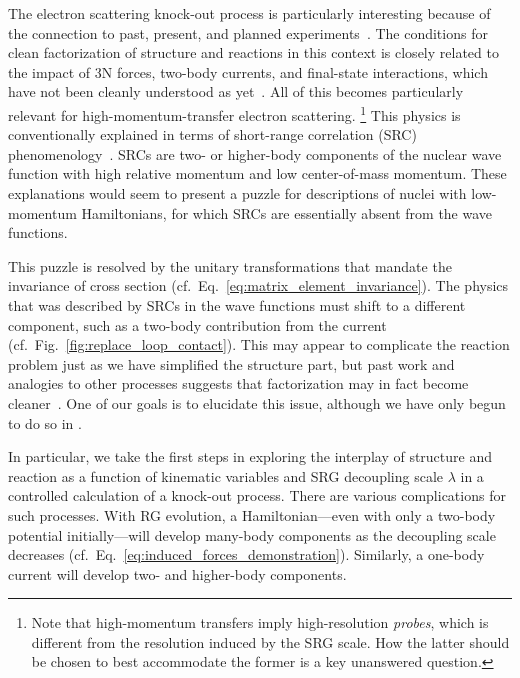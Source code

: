 	The electron scattering knock-out process is particularly interesting because
	of the connection to past, present, and planned
	experiments~\cite{Boffi:1996, LENP_white_paper2015}.
	The conditions for clean factorization
	of structure and reactions in this context is closely related to the impact of
	3N forces,
	two-body currents, and final-state interactions, which have not been cleanly
	understood as yet~\cite{Furnstahl:2010wd}.
	All of this becomes particularly relevant for high-momentum-transfer electron
	scattering.%
	\footnote{Note that high-momentum transfers imply high-resolution
	\emph{probes}, which is different from the resolution induced by the SRG
	scale.  How the latter should be chosen to best
	accommodate the former is a key unanswered question.}
	This physics is conventionally explained in terms of short-range correlation
	(SRC) phenomenology~\cite{Frankfurt:2008zv,Atti:2015eda}.  SRCs are two- or
	higher-body components of the nuclear wave function with high relative
	momentum and low center-of-mass momentum.  These explanations would seem to
	present a	puzzle for descriptions of nuclei with low-momentum Hamiltonians,
	for which	SRCs are essentially absent from the wave functions.

	This puzzle is resolved by the unitary transformations that mandate the
	invariance of cross section (cf.~Eq.~\eqref{eq:matrix_element_invariance}).
	The physics that was described by SRCs in the
	wave functions must shift to a different component, such as a two-body
	contribution from the current (cf.~Fig.~\ref{fig:replace_loop_contact}).
	This may appear to complicate the reaction
	problem just as we have simplified the structure part, but past work and
	analogies to other processes suggests that factorization may in fact
	become cleaner~\cite{Anderson:2010aq,Bogner:2012zm}.  One of our goals is to
	elucidate this issue, although we have only begun to do so in
	\cite{More:2015tpa}.

	In particular, we take the first steps in exploring the interplay of
	structure and reaction as a function of kinematic variables and SRG decoupling
	scale $\lambda$ in a controlled calculation of a knock-out process.  There are
	various complications for such processes.  With RG evolution, a
	Hamiltonian---even with only a two-body potential initially---will develop
	many-body components as the decoupling scale decreases
	(cf.~Eq.~\eqref{eq:induced_forces_demonstration}).  Similarly, a one-body
	current will develop two- and higher-body components.

